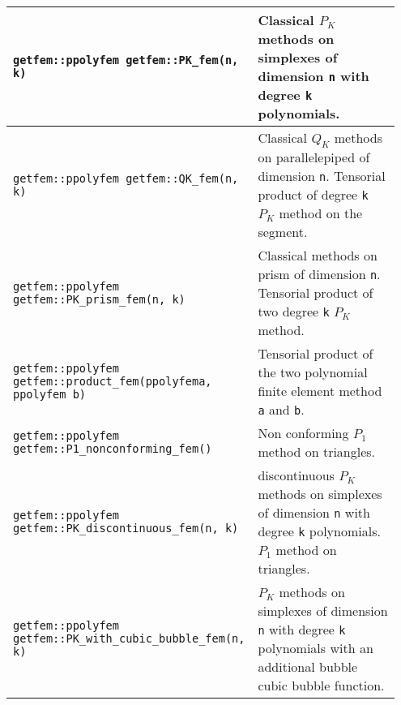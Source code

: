 \begin{center} \begin{tabular}{|m{0.55\linewidth}|m{0.4\linewidth}|} \hline
{\tt getfem::ppolyfem getfem::PK\_fem(n, k)} & Classical $P_K$ methods on simplexes of dimension  {\tt n} with degree {\tt k} polynomials.\\ \hline
{\tt getfem::ppolyfem getfem::QK\_fem(n, k)} & Classical $Q_K$ methods on parallelepiped of dimension {\tt n}. Tensorial product of degree {\tt k} $P_K$ method on the segment. \\ \hline
{\tt getfem::ppolyfem getfem::PK\_prism\_fem(n, k)} & Classical methods on prism of dimension {\tt n}. Tensorial product of two degree {\tt k} $P_K$ method. \\ \hline
{\tt getfem::ppolyfem getfem::product\_fem(ppolyfem\;a, ppolyfem b)} & Tensorial product of the two polynomial finite element method {\tt a} and {\tt b}. \\ \hline
{\tt getfem::ppolyfem getfem::P1\_nonconforming\_fem()} & Non conforming $P_1$ method on triangles. \\ \hline
{\tt getfem::ppolyfem getfem::PK\_discontinuous\_fem(n, k)} & discontinuous $P_K$ methods on simplexes of dimension  {\tt n} with degree {\tt k} polynomials. $P_1$ method on triangles. \\ \hline
{\tt getfem::ppolyfem $\hspace{5em}$ getfem::PK\_with\_cubic\_bubble\_fem(n, k)} & $P_K$ methods on simplexes of dimension  {\tt n} with degree {\tt k} polynomials with an additional bubble cubic bubble function.  \\ \hline
\end{tabular} \end{center}
